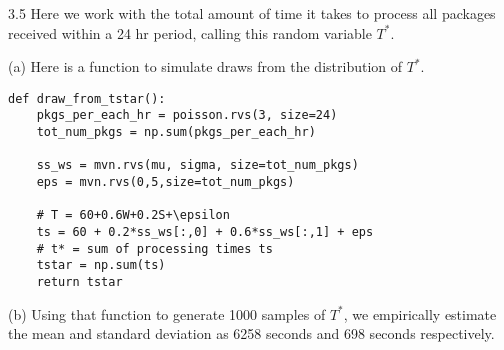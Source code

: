 \documentclass{harvardml}
\theoremstyle{definition}
\theoremstyle{plain}
\begin{document}
\medskip

3.5 Here we work with the total amount of time it takes to process all packages received within a 24 hr period, calling this random variable $T^*$.

(a) Here is a function to simulate draws from the distribution of $T^*$.
\lstset{language=Python}
\begin{lstlisting}
def draw_from_tstar():
    pkgs_per_each_hr = poisson.rvs(3, size=24)
    tot_num_pkgs = np.sum(pkgs_per_each_hr)

    ss_ws = mvn.rvs(mu, sigma, size=tot_num_pkgs)
    eps = mvn.rvs(0,5,size=tot_num_pkgs)
    
    # T = 60+0.6W+0.2S+\epsilon
    ts = 60 + 0.2*ss_ws[:,0] + 0.6*ss_ws[:,1] + eps
    # t* = sum of processing times ts
    tstar = np.sum(ts)
    return tstar
\end{lstlisting}

\smallskip
(b) Using that function to generate 1000 samples of $T^*$, we empirically estimate the mean and standard deviation as 6258 seconds and 698 seconds respectively.
\end{document}
